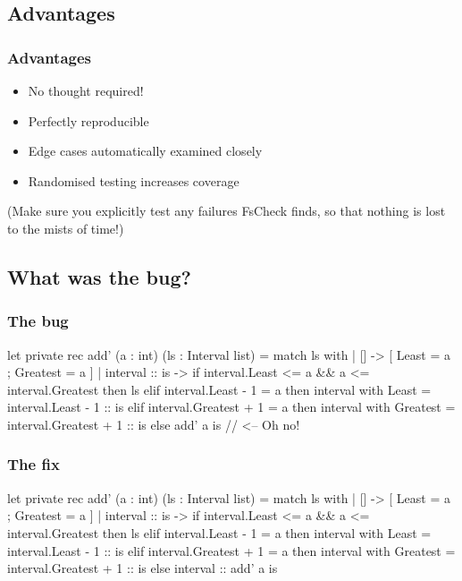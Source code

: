\documentclass{beamer}
\begin{document}
\subsection{Advantages}

\begin{frame}
\frametitle{Advantages}

\begin{itemize}
\item No thought required!
\item Perfectly reproducible
\item Edge cases automatically examined closely
\item Randomised testing increases coverage
\end{itemize}

\hfill \break

(Make sure you explicitly test any failures FsCheck finds, so that nothing is lost to the mists of time!)
\end{frame}

\subsection{What was the bug?}
\begin{frame}[fragile]
\frametitle{The bug}
\begin{fslisting}
let private rec add' (a : int) (ls : Interval list) =
    match ls with
    | [] -> [{ Least = a ; Greatest = a }]
    | interval :: is ->
        if interval.Least <= a && a <= interval.Greatest then
            ls
        elif interval.Least - 1 = a then
            { interval with Least = interval.Least - 1 }
            :: is
        elif interval.Greatest + 1 = a then
            { interval with Greatest = interval.Greatest + 1 }
            :: is
        else
            add' a is // <-- Oh no!
\end{fslisting}
\end{frame}

\begin{frame}[fragile]
\frametitle{The fix}
\begin{fslisting}
let private rec add' (a : int) (ls : Interval list) =
    match ls with
    | [] -> [{ Least = a ; Greatest = a }]
    | interval :: is ->
        if interval.Least <= a && a <= interval.Greatest then
            ls
        elif interval.Least - 1 = a then
            { interval with Least = interval.Least - 1 }
            :: is
        elif interval.Greatest + 1 = a then
            { interval with Greatest = interval.Greatest + 1 }
            :: is
        else
            interval :: add' a is
\end{fslisting}
\end{frame}
\end{document}
